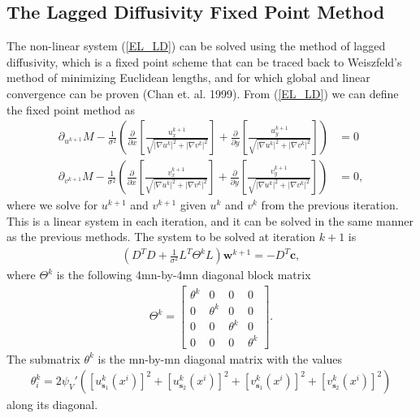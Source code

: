 \documentclass[10pt,a4paper]{article}
\begin{document}
\subsection{The Lagged Diffusivity Fixed Point Method}
The non-linear system (\ref{EL_LD}) can be solved using the method of lagged diffusivity, which is a fixed point scheme that can be traced back to Weiszfeld's method of minimizing Euclidean lengths, and for which global and linear convergence can be proven (Chan et. al. 1999). From (\ref{EL_LD}) we can define the fixed point method as
\begin{align*}
\partial_{u^{k+1}} M - \frac{1}{\sigma^2} \left(\frac{\partial}{\partial x}\left[ \frac{u^{k+1}_x}{\sqrt{|\nabla u^k|^2 + |\nabla v^k|^2}} \right] + \frac{\partial}{\partial y} \left[ \frac{u^{k+1}_y}{\sqrt{|\nabla u^k|^2 + |\nabla v^k|^2}} \right] \right) &= 0 \\
\partial_{v^{k+1}} M - \frac{1}{\sigma^2} \left(\frac{\partial}{\partial x}\left[ \frac{v^{k+1}_x}{\sqrt{|\nabla u^k|^2 + |\nabla v^k|^2}} \right] + \frac{\partial}{\partial y} \left[ \frac{v^{k+1}_y}{\sqrt{|\nabla u^k|^2 + |\nabla v^k|^2}} \right] \right) &= 0,
\end{align*}
where we solve for $u^{k+1}$ and $v^{k+1}$ given $u^k$ and $v^k$ from the previous iteration. This is a linear system in each iteration, and it can be solved in the same manner as the previous methods. The system to be solved at iteration $k+1$ is
\begin{align*}
(D^T D + \frac{1}{\sigma^2} L^T\Theta^{k}L) \textbf{w}^{k+1} = - D^T \textbf{c},
\end{align*}
where $\Theta^k$ is the following 4mn-by-4mn diagonal block matrix
\begin{align*}
\Theta^k = \left[
\begin{array}{c|c|c|c}
\theta^k & 0 & 0 & 0 \\ \hline
0 & \theta^k & 0 & 0 \\ \hline
0 & 0 & \theta^k & 0 \\ \hline
0 & 0 & 0 & \theta^k
\end{array}
\right].
\end{align*}
The submatrix $\theta^k$ is the mn-by-mn diagonal matrix with the values 
\begin{align*}
\theta^k_i = 2 \psi_V'\left( \left[u^k_{\textbf{s}_1}(x^i)\right]^2 + \left[u^k_{\textbf{s}_2}(x^i)\right]^2 + \left[v^k_{\textbf{s}_1}(x^i)\right]^2 + \left[v^k_{\textbf{s}_2}(x^i)\right]^2 \right)
\end{align*}
along its diagonal.
  
\end{document}
